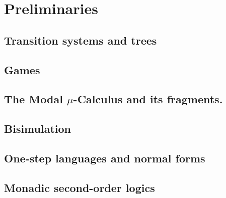 \documentclass[prodmode,acmtecs]{acmsmall} %
\begin{document}
\clearpage


\section{Preliminaries}\label{sec:prel}

\subsection{Transition systems and trees} \label{ssec:prelim_trees}

\subsection{Games}



\subsection{The Modal $\mu$-Calculus and its fragments.}\label{subsec:mu}



\subsection{Bisimulation}


%
%



\subsection{One-step languages and normal forms}



\subsection{Monadic second-order logics}\label{sec:prel-so}

\end{document}
